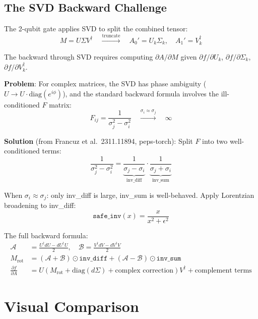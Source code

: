 \documentclass[11pt]{article}
\begin{document}
\subsection{The SVD Backward Challenge}

The 2-qubit gate applies SVD to split the combined tensor:
\[
M = U \Sigma V^\dagger \quad \xrightarrow{\text{truncate}} \quad A_0' = U_k \Sigma_k, \quad A_1' = V_k^\dagger
\]

The backward through SVD requires computing $\partial A / \partial M$ given $\partial f / \partial U_k$, $\partial f / \partial \Sigma_k$, $\partial f / \partial V_k^\dagger$.

\textbf{Problem}: For complex matrices, the SVD has phase ambiguity ($U \to U \cdot \text{diag}(e^{i\phi})$), and the standard backward formula involves the ill-conditioned $F$ matrix:
\[
F_{ij} = \frac{1}{\sigma_j^2 - \sigma_i^2} \quad \xrightarrow{\sigma_i \approx \sigma_j} \quad \infty
\]

\textbf{Solution} (from Francuz et al.\ 2311.11894, peps-torch): Split $F$ into two well-conditioned terms:
\[
\frac{1}{\sigma_j^2 - \sigma_i^2} = \underbrace{\frac{1}{\sigma_j - \sigma_i}}_{\text{inv\_diff}} \cdot \underbrace{\frac{1}{\sigma_j + \sigma_i}}_{\text{inv\_sum}}
\]

When $\sigma_i \approx \sigma_j$: only inv\_diff is large, inv\_sum is well-behaved. Apply Lorentzian broadening to inv\_diff:
\[
\texttt{safe\_inv}(x) = \frac{x}{x^2 + \epsilon^2}
\]

The full backward formula:
\begin{align}
\mathcal{A} &= \frac{U^\dagger dU - dU^\dagger U}{2}, \quad \mathcal{B} = \frac{V^\dagger dV - dV^\dagger V}{2} \\
M_{\text{rot}} &= (\mathcal{A} + \mathcal{B}) \odot \texttt{inv\_diff} + (\mathcal{A} - \mathcal{B}) \odot \texttt{inv\_sum} \\
\frac{\partial f}{\partial A} &= U \left( M_{\text{rot}} + \text{diag}(d\Sigma) + \text{complex correction} \right) V^\dagger + \text{complement terms}
\end{align}

\section{Visual Comparison}
\end{document}
